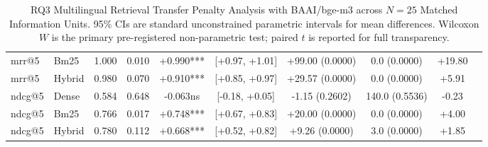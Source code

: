 \begin{table}[t]
\begin{tabular}{llcccccccc}
mrr@5 & Bm25 & 1.000 & 0.010 & +0.990*** & [+0.97, +1.01] & +99.00 (0.0000) & 0.0 (0.0000) & +19.80 \\
mrr@5 & Hybrid & 0.980 & 0.070 & +0.910*** & [+0.85, +0.97] & +29.57 (0.0000) & 0.0 (0.0000) & +5.91 \\
ndcg@5 & Dense & 0.584 & 0.648 & -0.063ns & [-0.18, +0.05] & -1.15 (0.2602) & 140.0 (0.5536) & -0.23 \\
ndcg@5 & Bm25 & 0.766 & 0.017 & +0.748*** & [+0.67, +0.83] & +20.00 (0.0000) & 0.0 (0.0000) & +4.00 \\
ndcg@5 & Hybrid & 0.780 & 0.112 & +0.668*** & [+0.52, +0.82] & +9.26 (0.0000) & 3.0 (0.0000) & +1.85 \\
\bottomrule
\end{tabular}
\caption{RQ3 Multilingual Retrieval Transfer Penalty Analysis with BAAI/bge-m3 across $N=25$ Matched Information Units. 95\% CIs are standard unconstrained parametric intervals for mean differences. Wilcoxon $W$ is the primary pre-registered non-parametric test; paired $t$ is reported for full transparency.}
\label{tab:rq3_transfer_penalty_bge_m3}
\end{table}
